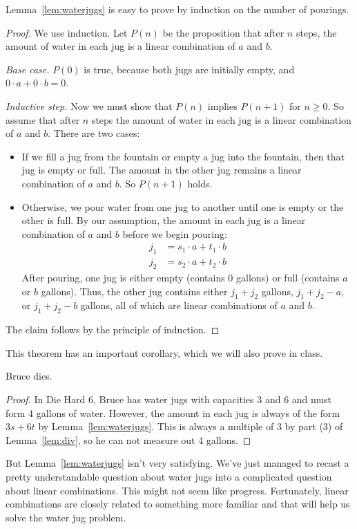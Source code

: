 Lemma~\ref{lem:waterjugs} is easy to prove by induction on the number of
pourings.

\begin{proof}
We use induction.  Let $P(n)$ be the proposition that after $n$ steps,
the amount of water in each jug is a linear combination of $a$ and
$b$.

\noindent \textit{Base case.}  $P(0)$ is true, because both jugs are
initially empty, and $0 \cdot a + 0 \cdot b = 0$.

\noindent \textit{Inductive step.}  Now we must show that $P(n)$
implies $P(n+1)$ for $n \geq 0$.  So assume that after $n$ steps the
amount of water in each jug is a linear combination of $a$ and $b$.
There are two cases:
%
\begin{itemize}
%
\item If we fill a jug from the fountain or empty a jug into the
fountain, then that jug is empty or full.  The amount in the other jug
remains a linear combination of $a$ and $b$.  So $P(n+1)$ holds.

\item Otherwise, we pour water from one jug to another until one is
empty or the other is full.  By our assumption, the amount in each jug
is a linear combination of $a$ and $b$ before we begin pouring:
%
\begin{align*}
j_1 & = s_1 \cdot a + t_1 \cdot b \\
j_2 & = s_2 \cdot a + t_2 \cdot b
\end{align*}
%
After pouring, one jug is either empty (contains 0 gallons) or full
(contains $a$ or $b$ gallons).  Thus, the other jug contains either
$j_1 + j_2$ gallons, $j_1 + j_2 - a$, or $j_1 + j_2 - b$ gallons, all
of which are linear combinations of $a$ and $b$.
\end{itemize}
%
The claim follows by the principle of induction.
\end{proof}

This theorem has an important corollary, which we will also
prove in class.

\begin{corollary}
Bruce dies.
\end{corollary}

\begin{proof}
In Die Hard 6, Bruce has water jugs with capacities 3 and 6 and must
form 4 gallons of water.  However, the amount in each jug is always of
the form $3s + 6t$ by Lemma~\ref{lem:waterjugs}.  This is always a
multiple of 3 by part (3) of Lemma~\ref{lem:div}, so he can not
measure out 4 gallons.
\end{proof}

But Lemma~\ref{lem:waterjugs} isn't very satisfying.  We've just managed
to recast a pretty understandable question about water jugs into a
complicated question about linear combinations.  This might not seem like
progress.  Fortunately, linear combinations are closely related to
something more familiar and that will help us solve the water jug problem.

\endinput